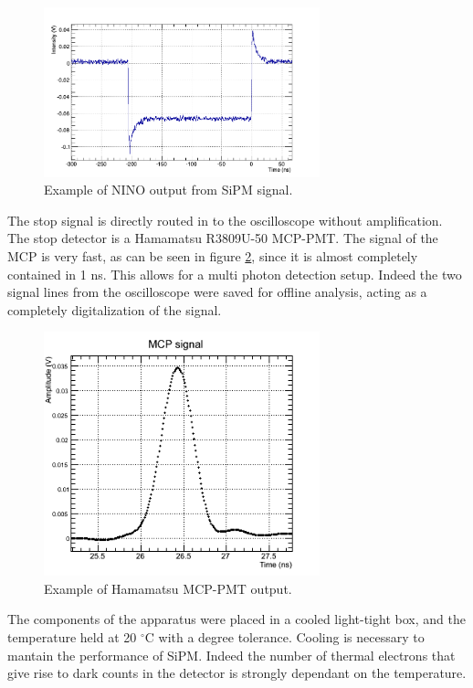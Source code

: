 \begin{figure}[htbp]
\begin{center}
\includegraphics[width=8cm]{../Pictures/Chapter_8/NINO_signal.png}
\end{center}
\caption[NINO signal sample]{Example of NINO output from SiPM signal.}
\label{fig:NINO_sign}
\end{figure}
The stop signal is directly routed in to the oscilloscope without amplification. The stop detector is a Hamamatsu R3809U-50 MCP-PMT.
The signal of the MCP is very fast, as can be seen in figure \ref{fig:MCP_sign}, since it is almost completely contained in 1 ns. This allows for a multi photon detection setup.
Indeed the two signal lines from the oscilloscope were saved for offline analysis, acting as a completely digitalization of the signal.
\begin{figure}[htbp]
\begin{center}
\includegraphics[width=8cm]{../Pictures/Chapter_8/MCP_signal.png}
\end{center}
\caption[MCP signal sample]{Example of Hamamatsu MCP-PMT output.}
\label{fig:MCP_sign}
\end{figure}
The components of the apparatus were placed in a cooled light-tight box, and the temperature held at 20 $^{\circ}$C with a degree tolerance.
Cooling is necessary to mantain the performance of SiPM. Indeed the number of thermal electrons that give rise to dark counts in the detector is strongly dependant on the temperature.
